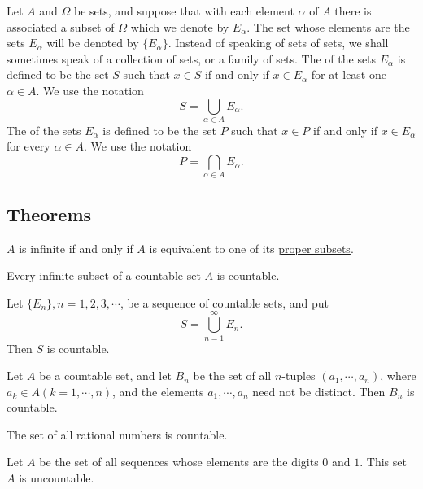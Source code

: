 \begin{definition}
	Let $A$ and $\Omega$ be sets, and suppose that with each element $\alpha$ of $A$ there is associated a subset of $\Omega$ which we denote by $E_\alpha$. The set whose elements are the sets $E_\alpha$ will be denoted by $\{E_\alpha\}$. Instead of speaking of sets of sets, we shall sometimes speak of a collection of sets, or a family of sets. The {} of the sets $E_\alpha$ is defined to be the set $S$ such that $x \in S$ if and only if $x \in E_\alpha$ for at least one $\alpha \in A$. We use the notation $$S = \bigcup\limits_{\alpha \in A} E_\alpha.$$ The {} of the sets $E_\alpha$ is defined to be the set $P$ such that $x \in P$ if and only if $x \in E_\alpha$ for every $\alpha \in A$. We use the notation $$P = \bigcap\limits_{\alpha \in A} E_\alpha.$$
\end{definition}

\subsection{Theorems}
\begin{theorem}
	$A$ is infinite if and only if $A$ is equivalent to one of its {\underline{proper subsets}}.
\end{theorem}

\begin{theorem}
	Every infinite subset of a countable set $A$ is countable.
\end{theorem}

\begin{theorem}
	Let $\{E_n\}, n = 1, 2, 3, \cdots$, be a sequence of countable sets, and put $$S = \bigcup\limits_{n=1}^\infty E_n.$$ Then $S$ is countable.
\end{theorem}

\begin{theorem}
	Let $A$ be a countable set, and let $B_n$ be the set of all $n$-tuples $(a_1,\cdots,a_n)$, where $a_k \in A (k = 1, \cdots, n)$, and the elements $a_1, \cdots, a_n$ need not be distinct. Then $B_n$ is countable.
\end{theorem}

\begin{corollary}
	The set of all rational numbers is countable.
\end{corollary}

\begin{theorem}
	Let $A$ be the set of all sequences whose elements are the digits $0$ and $1$. This set $A$ is uncountable.
\end{theorem}

